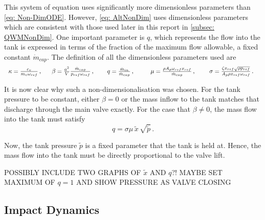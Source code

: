 This system of equation uses significantly more dimensionless parameters than \cref{eq: Non-DimODE}. However, \cref{eq: AltNonDim} uses dimensionless parameters which are consistent with those used later in this report in \cref{subsec: QWMNonDim}. One important parameter is $q$, which represents the flow into the tank is expressed in terms of the fraction of the maximum flow allowable, a fixed constant $\dot{m}_{cap}$. The definition of all the dimensionless parameters used are
~
\begin{equation*}
    \begin{tabular}{p{2.1cm} p{2.8cm} p{2.1cm} p{3cm} p{2.8cm}}
        $ \kappa = \frac{c_v}{m_v \omega_{ref}} \, , $
        &
        $ \beta = \frac{a^2}{V} \frac{\dot{m}_{cap}}{p_{ref} \omega_{ref}} \, , $
        &
        $ q = \frac{\dot{m}_{in}}{\dot{m}_{cap}} \, , $
        &
        $ \mu = \frac{\rho A_p \omega_{ref} x_{ref}}{\dot{m}_{cap}} \, , $
        &
        $ \sigma = \frac{\zeta x_{ref} \sqrt{\rho p_{ref}}}{A_p \rho x_{ref} \omega_{ref}} \, . $
    \end{tabular}
\end{equation*}

It is now clear why such a non-dimensionalisation was chosen. For the tank pressure to be constant, either $\beta = 0$ or the mass inflow to the tank matches that discharge through the main valve exactly. For the case that $\beta \neq 0$, the mass flow into the tank must satisfy
~
\begin{equation*}
    q = \sigma \mu \, \tilde{x} \, \sqrt{\tilde{p}} \, .
\end{equation*}

Now, the tank pressure $\tilde{p}$ is a fixed parameter that the tank is held at. Hence, the mass flow into the tank must be directly proportional to the valve lift.

POSSIBLY INCLUDE TWO GRAPHS OF $\tilde{x}$ AND $q$?! MAYBE SET MAXIMUM OF $q = 1$ AND SHOW PRESSURE AS VALVE CLOSING

\subsection{Impact Dynamics} \label{sec: ImpactDynamics}

